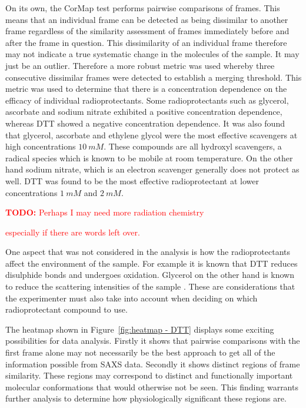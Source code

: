 On its own, the CorMap test performs pairwise comparisons of frames.
This means that an individual frame can be detected as being dissimilar to another frame regardless of the similarity assessment of frames immediately before and after the frame in question.
This dissimilarity of an individual frame therefore may not indicate a true systematic change in the molecules of the sample.
It may just be an outlier.
Therefore a more robust metric was used whereby three consecutive dissimilar frames were detected to establish a merging threshold.
This metric was used to determine that there is a concentration dependence on the efficacy of individual radioprotectants. Some radioprotectants such as glycerol, ascorbate and sodium nitrate exhibited a positive concentration dependence, whereas DTT showed a negative concentration dependence.
It was also found that glycerol, ascorbate and ethylene glycol were the most effective scavengers at high concentrations $10\ mM$.
These compounds are all hydroxyl scavengers, a radical species which is known to be mobile at room temperature.
On the other hand sodium nitrate, which is an electron scavenger generally does not protect as well.
DTT was found to be the most effective radioprotectant at lower concentrations $1\ mM$ and $2\ mM$.
\textcolor{red}{
    \begin{myenumerate}
        \item \hypertarget{todo:more chemical information}{\textbf{TODO:} Perhaps I may need more radiation chemistry}
        especially if there are words left over.
    \end{myenumerate}
}

One aspect that was not considered in the analysis is how the radioprotectants affect the environment of the sample.
For example it is known that DTT reduces disulphide bonds and undergoes oxidation.
Glycerol on the other hand is known to reduce the scattering intensities of the sample \cite{jeffries2015limiting}.
These are considerations that the experimenter must also take into account when deciding on which radioprotectant compound to use.

The heatmap shown in Figure~\ref{fig:heatmap - DTT} displays some exciting possibilities for data analysis.
Firstly it shows that pairwise comparisons with the first frame alone may not necessarily be the best approach to get all of the information possible from SAXS data.
Secondly it shows distinct regions of frame similarity.
These regions may correspond to distinct and functionally important molecular conformations that would otherwise not be seen.
This finding warrants further analysis to determine how physiologically significant these regions are.

